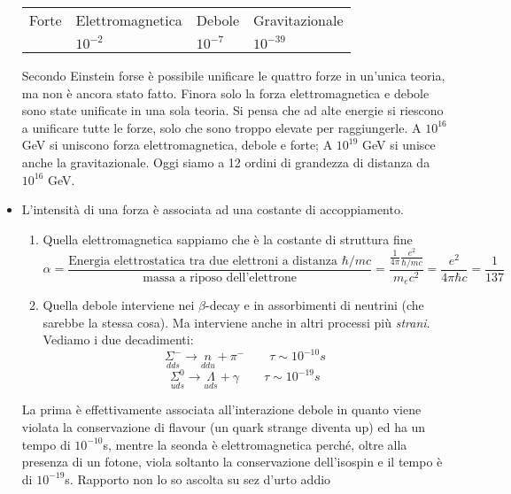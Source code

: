 \begin{itemize}
\begin{tabular}{>{\centering\arraybackslash}m{3cm} >{\centering\arraybackslash}m{3cm} >{\centering\arraybackslash}m{3cm} >{\centering\arraybackslash}m{3cm}}
        Forte & Elettromagnetica & Debole & Gravitazionale \\
        1 & $10^{-2}$    & $10^{-7}$    & $10^{-39}$    \\
    \end{tabular}
    Secondo Einstein forse è possibile unificare le quattro forze in un'unica teoria, ma non è ancora stato fatto. Finora solo la forza elettromagnetica e debole sono state unificate in una sola teoria. Si pensa che ad alte energie si riescono a unificare tutte le forze, solo che sono troppo elevate per raggiungerle. A $10^{16}$ GeV si uniscono forza elettromagnetica, debole e forte; A $10^{19}$ GeV si unisce anche la gravitazionale. Oggi siamo a 12 ordini di grandezza di distanza da $10^{16}$ GeV. 
    \item L'intensità di una forza è associata ad una costante di accoppiamento.
    \begin{enumerate}
        \item Quella elettromagnetica sappiamo che è la costante di struttura fine
        \begin{equation*}
            \alpha=\frac{\text{Energia elettrostatica tra due elettroni a distanza }\hbar/mc}{\text{massa a riposo dell'elettrone}}=\frac{\frac1{4\pi}\frac{e^2}{\hbar/mc}}{m_ec^2}=\frac{e^2}{4\pi\hbar c}=\frac1{137}
        \end{equation*}
        \item Quella debole interviene nei $\beta$-decay e in assorbimenti di neutrini (che sarebbe la stessa cosa). Ma interviene anche in altri processi più \textit{strani}. Vediamo i due decadimenti:
        \begin{equation*}
            \underset{dds}{\Sigma^-}\to \underset{ddu}{n}+\pi^-\qquad \tau\sim10^{-10}s
        \end{equation*}
        \begin{equation*}
            \underset{uds}{\Sigma^0}\to \underset{uds}{\Lambda}+\gamma\qquad \tau\sim10^{-19}s
        \end{equation*}
    \end{enumerate}
    La prima è effettivamente associata all'interazione debole in quanto viene violata la conservazione di flavour (un quark strange diventa up) ed ha un tempo di $10^{-10}$s, mentre la seonda è elettromagnetica perché, oltre alla presenza di un fotone, viola soltanto la conservazione dell'isospin e il tempo è di $10^{-19}$s. Rapporto non lo so ascolta su sez d'urto addio
\end{itemize}